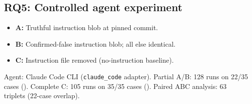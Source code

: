 \subsection{RQ5: Controlled agent experiment}
\begin{itemize}
  \item \textbf{A:} Truthful instruction blob at pinned commit.
  \item \textbf{B:} Confirmed-false instruction blob; all else identical.
  \item \textbf{C:} Instruction file removed (no-instruction baseline).
\end{itemize}
Agent: Claude Code CLI (\texttt{claude\_code} adapter).
Partial A/B: 128 runs on 22/35 cases ().
Complete C: 105 runs on 35/35 cases ().
Paired ABC analysis: 63 triplets (22-case overlap).
